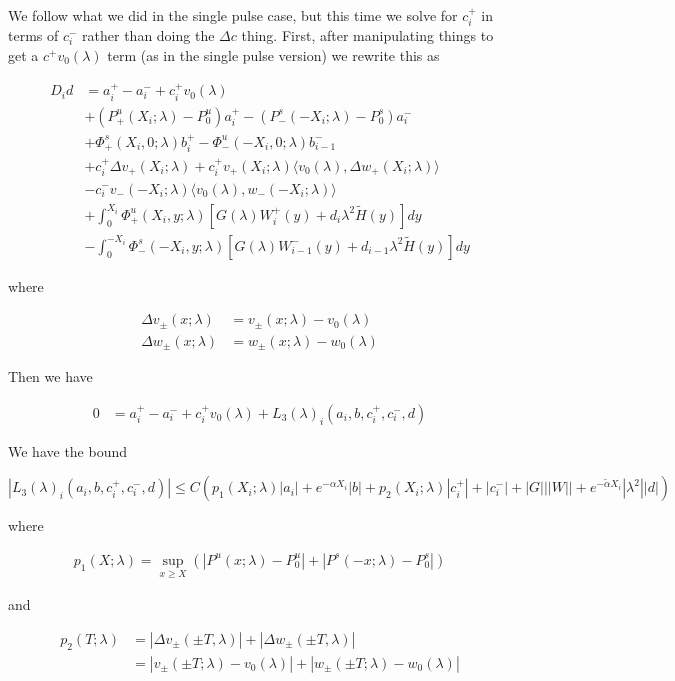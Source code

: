 \documentclass[12pt]{article}
\begin{document}
\begin{enumerate}
We follow what we did in the single pulse case, but this time we solve for $c_i^+$ in terms of $c_i^-$ rather than doing the $\Delta c$ thing. First, after manipulating things to get a $c^+ v_0(\lambda)$ term (as in the single pulse version) we rewrite this as

\begin{align*}
D_i d &= a_i^+ - a_i^- + c_i^+ v_0(\lambda) \\
&+ (P^u_+(X_i; \lambda) - P_0^u)a_i^+ - (P^s_-(-X_i; \lambda) - P_0^s)a_i^- \\
&+ \Phi^s_+(X_i, 0; \lambda)b_i^+ - \Phi^u_-(-X_i, 0; \lambda)b_{i-1}^- \\
&+ c_i^+ \Delta v_+(X_i; \lambda) + c_i^+ v_+(X_i; \lambda) \langle v_0(\lambda), \Delta w_+(X_i; \lambda) \rangle \\
&- c_i^- v_-(-X_i; \lambda) \langle v_0(\lambda), w_-(-X_i; \lambda) \rangle \\
&+ \int_0^{X_i} \Phi^u_+(X_i, y; \lambda) [ G(\lambda)W_i^+(y) + d_i \lambda^2 \tilde{H}(y) ] dy \\
&- \int_0^{-X_i} \Phi^s_-(-X_i, y; \lambda) [ G(\lambda)W_{i-1}^-(y) + d_{i-1} \lambda^2 \tilde{H}(y) ] dy
\end{align*}

where

\begin{align*}
\Delta v_\pm(x; \lambda) &= v_\pm(x; \lambda) - v_0(\lambda) \\
\Delta w_\pm(x; \lambda) &= w_\pm(x; \lambda) - w_0(\lambda)
\end{align*}

Then we have 

\begin{align*}
0 &= a_i^+ - a_i^- + c_i^+ v_0(\lambda) + L_3(\lambda)_i(a_i, b, c_i^+, c_i^-, d)
\end{align*}

We have the bound 

\[
|L_3(\lambda)_i(a_i, b, c_i^+, c_i^-, d)| \leq C ( p_1(X_i; \lambda)|a_i|
+ e^{-\alpha X_i}|b| + p_2(X_i; \lambda)|c_i^+| + |c_i^-| + |G| ||W|| + e^{-\tilde{\alpha} X_i} |\lambda^2| |d| )
\]

where

\begin{align*}
p_1(X;\lambda) = \sup_{x \geq X} (|P^u(x;\lambda) - P_0^u| + |P^s(-x;\lambda) - P_0^s|)
\end{align*}

and

\begin{align*}
p_2(T; \lambda) &= |\Delta v_\pm(\pm T, \lambda)| + |\Delta w_\pm(\pm T, \lambda)|\\
&= |v_\pm(\pm T; \lambda) - v_0(\lambda)| + |w_\pm(\pm T; \lambda) - w_0(\lambda)|
\end{align*}


\end{enumerate}
\end{document}
